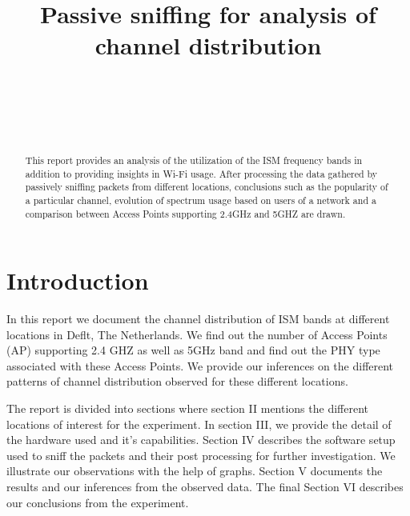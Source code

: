 \documentclass[conference]{IEEEtran}
\begin{document}
\title{Passive sniffing for analysis of channel distribution }
\author{ \\
\\ 
\and 
{}\\
}
\maketitle
\begin{abstract}

This report provides an analysis of the utilization of the ISM frequency bands in addition to providing insights in Wi-Fi usage. After processing the data gathered by passively sniffing packets from different locations, conclusions such as the popularity of a particular channel, evolution of spectrum usage based on users of a network and a comparison between Access Points supporting 2.4GHz and 5GHZ are drawn.    
\end{abstract}
\IEEEpeerreviewmaketitle
\section{Introduction}

In this report we document the channel distribution of ISM bands at different locations in Deflt, The Netherlands. We find out the number of Access Points (AP) supporting 2.4 GHZ as well as 5GHz band and find out the PHY type associated with these Access Points. We provide our inferences on the different patterns of channel distribution observed for these different locations. 

The report is divided into sections where section II mentions the different locations of interest for the experiment. In section III, we provide the detail of the hardware used and it's capabilities. Section IV describes the software setup used to sniff the packets and their post processing for further investigation. We illustrate our observations with the help of graphs. Section V documents the results and our inferences from the observed data. The final Section VI describes our conclusions from the experiment. 
\end{document}

